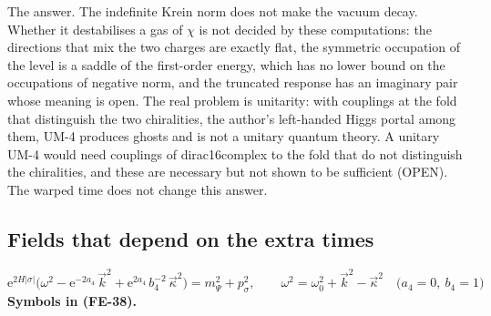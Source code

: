 \documentclass[
  10pt,
]{article}
\begin{document}
The answer. The indefinite Krein norm does not make the vacuum decay.
Whether it destabilises a gas of \(\chi\) is not decided by these
computations: the directions that mix the two charges are exactly flat,
the symmetric occupation of the level is a saddle of the first-order
energy, which has no lower bound on the occupations of negative norm,
and the truncated response has an imaginary pair whose meaning is open.
The real problem is unitarity: with couplings at the fold that
distinguish the two chiralities, the author's left-handed Higgs portal
among them, UM-4 produces ghosts and is not a unitary quantum theory. A
unitary UM-4 would need couplings of dirac16complex to the fold that do
not distinguish the chiralities, and these are necessary but not shown
to be sufficient (OPEN). The warped time does not change this answer.

\hypertarget{fields-that-depend-on-the-extra-times}{%
\subsection{Fields that depend on the extra
times}\label{fields-that-depend-on-the-extra-times}}

\[
\mathrm{e}^{2H\lvert\sigma\rvert}\Big(\omega^2 - \mathrm{e}^{-2a_4}\,\vec k^2 + \mathrm{e}^{2a_4}\,b_4^{-2}\,\vec\kappa^2\Big) = m_\Psi^2 + p_\sigma^2,\qquad
\omega^2 = \omega_0^2 + \vec k^2 - \vec\kappa^2\quad\big(a_4 = 0,\ b_4 = 1\big) \tag{FE-38}
\] \textbf{Symbols in (FE-38).}
\end{document}
